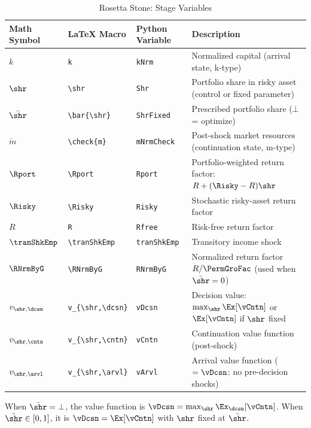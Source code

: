 \documentclass[titlepage, headings=optiontotocandhead]{econark}
\begin{document}
\begin{table}[h]
\caption{Rosetta Stone:  Stage Variables}
\label{tab:rosetta-portable}
\begin{center}
\begin{tabular}{l|l|l|l}
Math Symbol & \LaTeX{} Macro & Python Variable & Description \\
\hline
$k$             & \verb|k|             & \texttt{kNrm}        & Normalized capital (arrival state, k-type) \\
$\shr$              & \verb|\shr|              & \texttt{Shr}         & Portfolio share in risky asset (control or fixed parameter) \\
$\bar{\shr}$        & \verb|\bar{\shr}|        & \texttt{ShrFixed}    & Prescribed portfolio share ($\bot$ = optimize) \\
$\check{m}$     & \verb|\check{m}|     & \texttt{mNrmCheck}   & Post-shock market resources (continuation state, m-type) \\
$\Rport$            & \verb|\Rport|            & \texttt{Rport}       & Portfolio-weighted return factor: $R + (\Risky - R)\shr$ \\
$\Risky$            & \verb|\Risky|            & \texttt{Risky}       & Stochastic risky-asset return factor \\
$R$            & \verb|R|            & \texttt{Rfree}       & Risk-free return factor \\
$\tranShkEmp$       & \verb|\tranShkEmp|       & \texttt{tranShkEmp}  & Transitory income shock \\
$\RNrmByG$          & \verb|\RNrmByG|          & \texttt{RNrmByG}     & Normalized return factor $R / \PermGroFac$ (used when $\bar{\shr}=0$) \\
$v_{\shr,\dcsn}$ & \verb|v_{\shr,\dcsn}| & \texttt{vDcsn}  & Decision value: $\max_{\shr} \Ex[\vCntn]$ or $\Ex[\vCntn]$ if $\shr$ fixed \\
$v_{\shr,\cntn}$ & \verb|v_{\shr,\cntn}| & \texttt{vCntn}  & Continuation value function (post-shock) \\
$v_{\shr,\arvl}$ & \verb|v_{\shr,\arvl}| & \texttt{vArvl}  & Arrival value function ($= \vDcsn$; no pre-decision shocks) \\
\hline
\end{tabular}
\end{center}
\end{table}

\noindent When $\bar{\shr} = \bot$, the {\Decision} value function is $\vDcsn = \max_{\shr} \Ex_{\dcsn}[\vCntn]$.  When $\bar{\shr} \in [0,1]$, it is $\vDcsn = \Ex[\vCntn]$ with $\shr$ fixed at $\bar{\shr}$.
\end{document}
